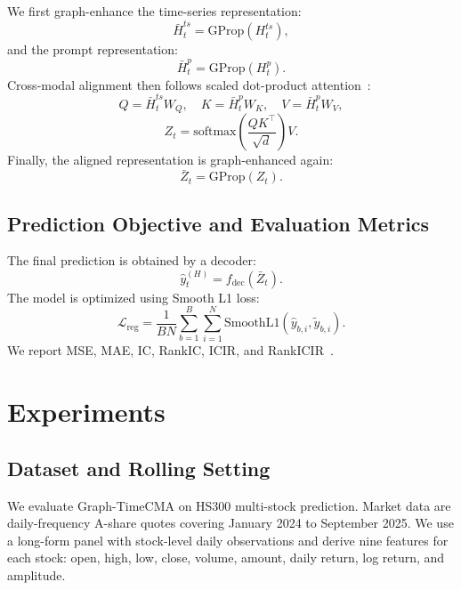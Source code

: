\documentclass[runningheads]{llncs}
\begin{document}
We first graph-enhance the time-series representation:
\begin{equation}
\bar{H}^{ts}_t = \text{GProp}(H^{ts}_t),
\end{equation}
and the prompt representation:
\begin{equation}
\bar{H}^{p}_t = \text{GProp}(H^{p}_t).
\end{equation}
Cross-modal alignment then follows scaled dot-product attention~\cite{vaswani2017attention}:
\begin{equation}
Q = \bar{H}^{ts}_t W_Q, \quad
K = \bar{H}^{p}_t W_K, \quad
V = \bar{H}^{p}_t W_V,
\end{equation}
\begin{equation}
Z_t = \text{softmax}\left(\frac{QK^\top}{\sqrt{d}}\right)V.
\end{equation}
Finally, the aligned representation is graph-enhanced again:
\begin{equation}
\bar{Z}_t = \text{GProp}(Z_t).
\end{equation}

\subsection{Prediction Objective and Evaluation Metrics}

The final prediction is obtained by a decoder:
\begin{equation}
\hat{y}^{(H)}_t = f_{\text{dec}}(\bar{Z}_t).
\end{equation}
The model is optimized using Smooth L1 loss:
\begin{equation}
\mathcal{L}_{\text{reg}} = \frac{1}{BN} \sum_{b=1}^{B} \sum_{i=1}^{N} \text{SmoothL1}(\hat{y}_{b,i}, \tilde{y}_{b,i}).
\end{equation}
We report MSE, MAE, IC, RankIC, ICIR, and RankICIR~\cite{grinold2000active}.

\section{Experiments}

\subsection{Dataset and Rolling Setting}

We evaluate Graph-TimeCMA on HS300 multi-stock prediction. Market data are daily-frequency A-share quotes covering January 2024 to September 2025. We use a long-form panel with stock-level daily observations and derive nine features for each stock: open, high, low, close, volume, amount, daily return, log return, and amplitude.
\end{document}

